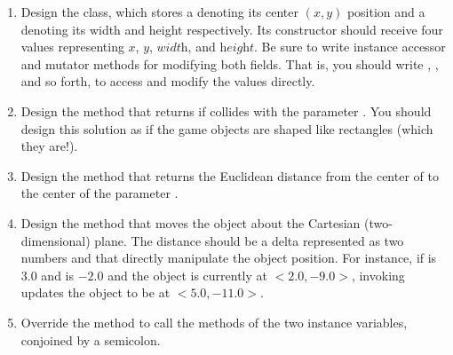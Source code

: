 \begin{enumerate}[label=(\alph*)]
    \item Design the  class, which stores a  denoting its center $(x, y)$ position and a  denoting its width and height respectively. Its constructor should receive four  values representing $x$, $y$, $\textit{width}$, and $\textit{height}$. Be sure to write instance accessor and mutator methods for modifying both fields. That is, you should write , , and so forth, to access and modify the  values directly. 

    \item Design the  method that returns if   collides with the parameter . You should design this solution as if the game objects are shaped like rectangles (which they are!).

    \item Design the  method that returns the Euclidean distance from the center of   to the center of the parameter . 

    \item Design the  method that moves the object about the Cartesian (two-dimensional) plane. The distance should be a delta represented as two  numbers  and  that directly manipulate the object position. For instance, if  is $3.0$ and  is $-2.0$ and the object is currently at $<2.0, -9.0>$, invoking  updates the object to be at $<5.0, -11.0>$.

    \item Override the  method to call the  methods of the two instance variables, conjoined by a semicolon.
\end{enumerate}

